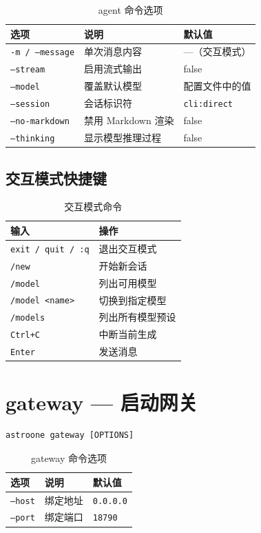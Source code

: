 \documentclass[12pt,a4paper,UTF8]{ctexart}
\begin{document}
\begin{table}[H]
\centering
\begin{tabular}{L{3.5cm} L{8cm} L{3.5cm}}
\toprule
\textbf{选项} & \textbf{说明} & \textbf{默认值} \\
\midrule
\texttt{-m / --message} & 单次消息内容 & —（交互模式） \\
\texttt{--stream} & 启用流式输出 & false \\
\texttt{--model} & 覆盖默认模型 & 配置文件中的值 \\
\texttt{--session} & 会话标识符 & \texttt{cli:direct} \\
\texttt{--no-markdown} & 禁用 Markdown 渲染 & false \\
\texttt{--thinking} & 显示模型推理过程 & false \\
\bottomrule
\end{tabular}
\caption{agent 命令选项}
\end{table}

\subsection{交互模式快捷键}

\begin{table}[H]
\centering
\begin{tabular}{L{4cm} L{11cm}}
\toprule
\textbf{输入} & \textbf{操作} \\
\midrule
\texttt{exit / quit / :q} & 退出交互模式 \\
\texttt{/new} & 开始新会话 \\
\texttt{/model} & 列出可用模型 \\
\texttt{/model <name>} & 切换到指定模型 \\
\texttt{/models} & 列出所有模型预设 \\
\texttt{Ctrl+C} & 中断当前生成 \\
\texttt{Enter} & 发送消息 \\
\bottomrule
\end{tabular}
\caption{交互模式命令}
\end{table}

\section{gateway — 启动网关}

\begin{verbatim}
astroone gateway [OPTIONS]
\end{verbatim}

\begin{table}[H]
\centering
\begin{tabular}{L{3.5cm} L{8cm} L{3.5cm}}
\toprule
\textbf{选项} & \textbf{说明} & \textbf{默认值} \\
\midrule
\texttt{--host} & 绑定地址 & \texttt{0.0.0.0} \\
\texttt{--port} & 绑定端口 & \texttt{18790} \\
\bottomrule
\end{tabular}
\caption{gateway 命令选项}
\end{table}
\end{document}
